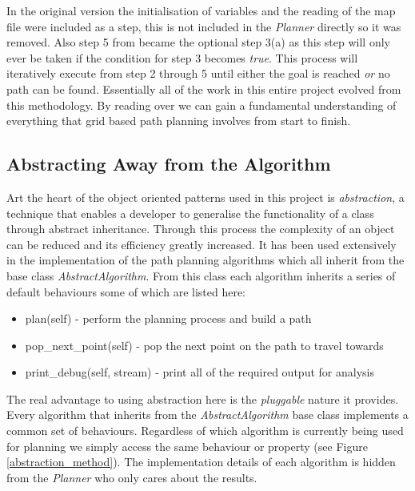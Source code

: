 \noindent
In the original version the initialisation of variables and the reading of the map file were included as a step, this is not included in the \textit{Planner} directly so it was removed. Also step 5 from \cite{GRIDNAV95} became the optional step 3(a) as this step will only ever be taken if the condition for step 3 becomes \textit{true}. This process will iteratively execute from step 2 through 5 until either the goal is reached \textit{or} no path can be found. Essentially all of the work in this entire project evolved from this methodology. By reading over \cite{GRIDNAV95} we can gain a fundamental understanding of everything that grid based path planning involves from start to finish. 

\subsection{Abstracting Away from the Algorithm}
\noindent
Art the heart of the object oriented patterns used in this project is \textit{abstraction}, a technique that enables a developer to generalise the functionality of a class through abstract inheritance. Through this process the complexity of an object can be reduced and its efficiency greatly increased. It has been used extensively in the implementation of the path planning algorithms which all inherit from the base class \textit{AbstractAlgorithm}. From this class each algorithm inherits a series of default behaviours some of which are listed here:

\newpage

\begin{itemize}
\item plan(self) - perform the planning process and build a path
\item pop\_next\_point(self) - pop the next point on the path to travel towards
\item print\_debug(self, stream) - print all of the required output for analysis
\end{itemize}

\noindent
The real advantage to using abstraction here is the \textit{pluggable} nature it provides. Every algorithm that inherits from the \textit{AbstractAlgorithm} base class implements a common set of behaviours. Regardless of which algorithm is currently being used for planning we simply access the same behaviour or property (see Figure \ref{abstraction_method}). The implementation details of each algorithm is hidden from the \textit{Planner} who only cares about the results.

